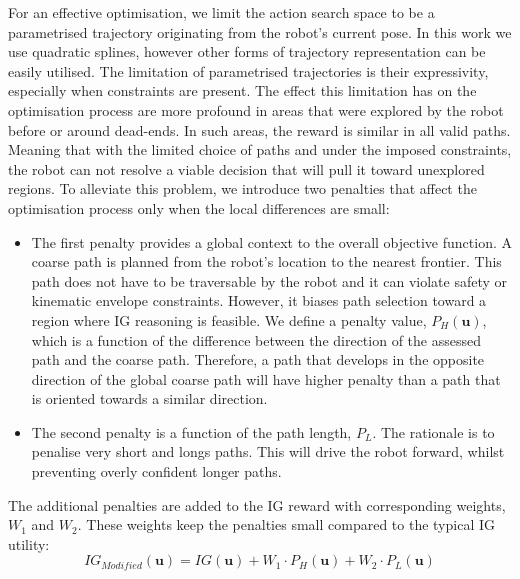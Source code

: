 \documentclass[shortAfour,sageh,times]{sagej_no_sage}
\begin{document}
	For an effective optimisation, we limit the action search space to be a parametrised trajectory originating from the robot's current pose. In this work we use quadratic splines, however other forms of trajectory representation can be easily utilised. The limitation of parametrised trajectories is their expressivity, especially when constraints are present. The effect this limitation has on the optimisation process are more profound in areas that were explored by the robot before or around dead-ends. In such areas, the reward is similar in all valid paths. Meaning that with the limited choice of paths and under the imposed constraints, the robot can not resolve a viable decision that will pull it toward unexplored regions. To alleviate this problem, we introduce two penalties that affect the optimisation process only when the local differences are small:
	\begin{itemize}
		\item The first penalty provides a global context to the overall objective function. A coarse path is planned from the robot's location to the nearest frontier. This path does not have to be traversable by the robot and it can violate safety or kinematic envelope constraints. However, it biases path selection toward a region where IG reasoning is feasible. We define a penalty value, $P_{H}(\boldsymbol{u})$, which is a function of the difference between the direction of the assessed path and the coarse path. Therefore, a path that develops in the opposite direction of the global coarse path will have higher penalty than a path that is oriented towards a similar direction.
		
		\item The second penalty is a function of the path length, $P_{L}$. The rationale is to penalise very short and longs paths. This will drive the robot forward, whilst preventing overly confident longer paths.
	\end{itemize}

    The additional penalties are added to the IG reward with corresponding weights, $W_1$ and $W_2$. These weights keep the penalties small compared to the typical IG utility:
   	\begin{equation}\label{ModifiedIG}
    		IG_{Modified}(\boldsymbol{u}) = 	IG(\boldsymbol{u}) + W_1\cdot P_{H}(\boldsymbol{u}) + W_2\cdot 	P_{L}(\boldsymbol{u})
   	\end{equation}
    
\end{document}
